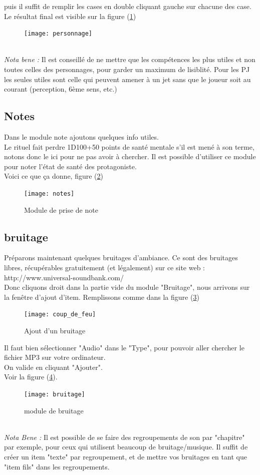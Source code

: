 \documentclass[a4paper,12pt]{article}
\begin{document}
puis il suffit de remplir les cases en double cliquant gauche sur chacune des case.
\\
Le résultat final est visible sur la figure (\ref{exemple_personnage})
\begin{figure}[h!]
    \texttt{[image: personnage]}
    \label{exemple_personnage}
\end{figure}
\\ \emph{Nota bene :} Il est conseillé de ne mettre que les compétences les plus utiles et non toutes celles des personnages, pour garder un maximum de lisiblité. Pour les PJ les seules utiles sont celle qui peuvent amener à un jet sans que le joueur soit au courant (perception, 6ème sens, etc.)

\subsection{Notes}
Dans le module note ajoutons quelques info utiles.
\\
Le rituel fait perdre 1D100+50 points de santé mentale s'il est mené à son terme, notons donc le ici pour ne pas avoir à chercher.
Il est possible d'utiliser ce module pour noter l'état de santé des protagoniste.
\\
Voici ce que ça donne, figure (\ref{note})
\begin{figure}[h!]
    \texttt{[image: notes]}
    \caption{Module de prise de note}
    \label{note}
\end{figure}

\subsection{bruitage}
Préparons maintenant quelques bruitages d'ambiance. Ce sont des bruitages libres, récupérables gratuitement (et légalement) sur ce site web : http://www.universal-soundbank.com/
\\
Donc cliquons droit dans la partie vide du module "Bruitage", nous arrivons sur la fenêtre d'ajout d'item. Remplissons comme dans la figure (\ref{coup de feu}) 
\begin{figure}[h!]
    \texttt{[image: coup\_de\_feu]}
    \caption{Ajout d'un bruitage}
    \label{coup de feu}
\end{figure}
Il faut bien sélectionner "Audio" dans le "Type", pour pouvoir aller chercher le fichier MP3 sur votre ordinateur.
\\
On valide en cliquant "Ajouter".
\\
Voir la figure (\ref{exemple_bruitage}).
\begin{figure}[h!]
    \texttt{[image: bruitage]}
    \caption{module de bruitage}
    \label{exemple_bruitage}
\end{figure}
\\ \emph{Nota Bene :} Il est possible de se faire des regroupements de son par "chapitre" par exemple, pour ceux qui utilisent beaucoup de bruitage/musique. Il suffit de créer un item "texte" par regroupement, et de mettre vos bruitages en tant que "item fils" dans les regroupements.
\end{document}
